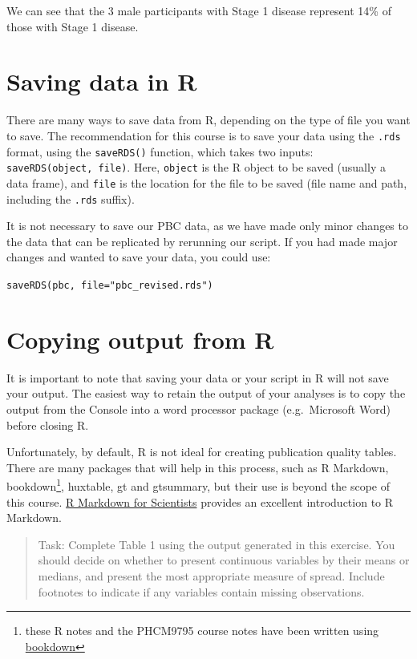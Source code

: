 \documentclass[
]{memoir}
\begin{document}
We can see that the 3 male participants with Stage 1 disease represent 14\% of those with Stage 1 disease.

\hypertarget{saving-data-in-r}{%
\section{Saving data in R}\label{saving-data-in-r}}

There are many ways to save data from R, depending on the type of file you want to save. The recommendation for this course is to save your data using the \texttt{.rds} format, using the \texttt{saveRDS()} function, which takes two inputs: \texttt{saveRDS(object,\ file)}. Here, \texttt{object} is the R object to be saved (usually a data frame), and \texttt{file} is the location for the file to be saved (file name and path, including the \texttt{.rds} suffix).

It is not necessary to save our PBC data, as we have made only minor changes to the data that can be replicated by rerunning our script. If you had made major changes and wanted to save your data, you could use:

\texttt{saveRDS(pbc,\ file="pbc\_revised.rds")}

\hypertarget{copying-output-from-r}{%
\section{Copying output from R}\label{copying-output-from-r}}

It is important to note that saving your data or your script in R will not save your output. The easiest way to retain the output of your analyses is to copy the output from the Console into a word processor package (e.g.~Microsoft Word) before closing R.

Unfortunately, by default, R is not ideal for creating publication quality tables. There are many packages that will help in this process, such as R Markdown, bookdown\footnote{these R notes and the PHCM9795 course notes have been written using \href{https://bookdown.org/yihui/bookdown/}{bookdown}}, huxtable, gt and gtsummary, but their use is beyond the scope of this course. \href{https://rmd4sci.njtierney.com/}{R Markdown for Scientists} provides an excellent introduction to R Markdown.

\begin{quote}
Task: Complete Table 1 using the output generated in this exercise. You should decide on whether to present continuous variables by their means or medians, and present the most appropriate measure of spread. Include footnotes to indicate if any variables contain missing observations.
\end{quote}
\end{document}
